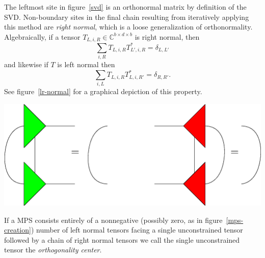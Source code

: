 \documentclass[12pt]{article}
\newenvironment{Figure}
  {\par\medskip\noindent\minipage{\linewidth}}
  {\endminipage\par\medskip}
\begin{document}
	\begin{multicols}{2}

	The leftmost site
	in figure~\ref{svd} is an orthonormal matrix by definition of the
	SVD. Non-boundary sites in the final chain resulting from
	iteratively applying this	method are \textit{right normal}, which is
	a loose generalization of orthonormality. Algebraically, if a tensor
	$T_{L,i,R}\in\mathds{C}^{b\times d\times b}$
	is right normal, then
	$$\sum_{i,R}T_{L,i,R}T^*_{L',i,R}=\delta_{L,L'}$$
	and likewise if $T$ is left normal then
	$$\sum_{i,L}T_{L,i,R}T^*_{L,i,R'}=\delta_{R,R'}.$$
	See figure~\ref{lr-normal} for a graphical depiction of this property.

	\begin{Figure}
		\center\includegraphics[width=.55\textwidth]{./Figures/lr_normal.eps}
		\label{lr-normal}
	\end{Figure}

	If a MPS consists entirely of a nonnegative (possibly zero, as in
	figure~\ref{mps-creation}) number of left normal tensors facing a
	single unconstrained tensor followed by a chain of right normal
	tensors we call the single unconstrained tensor the
	\textit{orthogonality center}.



\end{multicols}
\end{document}
